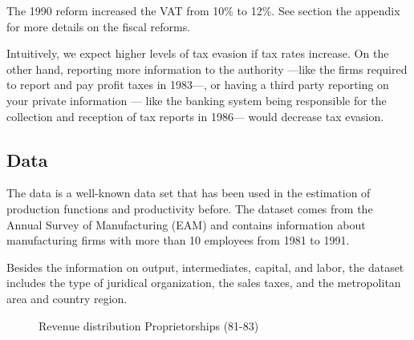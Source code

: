 \documentclass[
  12pt]{article}
\begin{document}
The 1990 reform increased the VAT from 10\% to 12\%. See section the
appendix for more details on the fiscal reforms.

Intuitively, we expect higher levels of tax evasion if tax rates
increase. On the other hand, reporting more information to the authority
---like the firms required to report and pay profit taxes in 1983---, or
having a third party reporting on your private information --- like the
banking system being responsible for the collection and reception of tax
reports in 1986--- would decrease tax evasion.

\subsection{Data}\label{data}

The data is a well-known data set that has been used in the estimation
of production functions and productivity before. The dataset comes from
the Annual Survey of Manufacturing (EAM) and contains information about
manufacturing firms with more than 10 employees from 1981 to 1991.

Besides the information on output, intermediates, capital, and labor,
the dataset includes the type of juridical organization, the sales
taxes, and the metropolitan area and country region.

\begin{figure}

\caption{\label{fig-revenue-hist-bunch-0}Revenue distribution
Proprietorships (81-83)}


\end{figure}%
\end{document}
